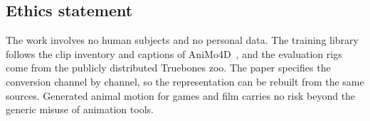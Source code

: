 \subsection*{Ethics statement}
The work involves no human subjects and no personal data. The training library follows the clip
inventory and captions of AniMo4D~\citep{wang2025animo}, and the evaluation rigs come from the publicly
distributed Truebones zoo. The paper specifies the conversion channel by channel, so the representation
can be rebuilt from the same sources. Generated animal motion for games and film carries no risk beyond
the generic misuse of animation tools.

